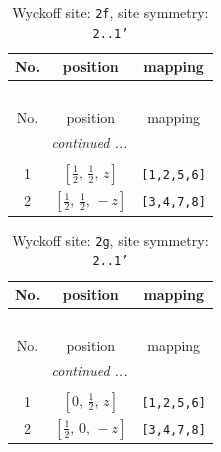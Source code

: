 \documentclass[fleqn,8pt]{jsarticle}
\begin{document}
\renewcommand{\arraystretch}{1.2}
\begin{longtable}{ccc}
\caption{Wyckoff site: {\tt 2f}, site symmetry: {\tt 2..1'}}
 \\
 \hline \hline
No. & position & mapping \\ \hline \endfirsthead

\multicolumn{2}{l}{\tablename\ \thetable{}} \\
 \hline \hline
No. & position & mapping \\ \hline \endhead

 \hline \hline
\multicolumn{2}{r}{\footnotesize\it continued ...} \\ \endfoot

 \hline \hline
\multicolumn{2}{r}{} \\ \endlastfoot

1 & $\left[ \frac{1}{2},\, \frac{1}{2},\, z \right]$ & {\tt [1,2,5,6]} \\ \hline
2 & $\left[ \frac{1}{2},\, \frac{1}{2},\, - z \right]$ & {\tt [3,4,7,8]} \\
\end{longtable}
\renewcommand{\arraystretch}{1.2}
\begin{longtable}{ccc}
\caption{Wyckoff site: {\tt 2g}, site symmetry: {\tt 2..1'}}
 \\
 \hline \hline
No. & position & mapping \\ \hline \endfirsthead

\multicolumn{2}{l}{\tablename\ \thetable{}} \\
 \hline \hline
No. & position & mapping \\ \hline \endhead

 \hline \hline
\multicolumn{2}{r}{\footnotesize\it continued ...} \\ \endfoot

 \hline \hline
\multicolumn{2}{r}{} \\ \endlastfoot

1 & $\left[ 0,\, \frac{1}{2},\, z \right]$ & {\tt [1,2,5,6]} \\ \hline
2 & $\left[ \frac{1}{2},\, 0,\, - z \right]$ & {\tt [3,4,7,8]} \\
\end{longtable}
\renewcommand{\arraystretch}{1.2}
\end{document}
